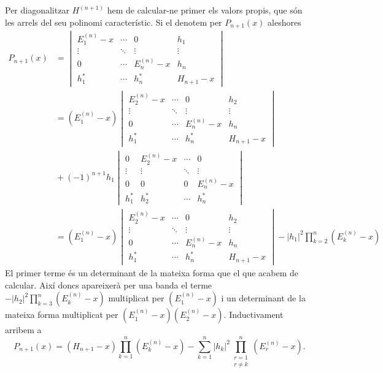 \documentclass[12pt]{article}
\numberwithin{table}{section}
\numberwithin{figure}{section}
\numberwithin{equation}{section}
\newcommand{\abs}[1]{\lvert #1 \rvert}
\begin{document}
Per diagonalitzar \( H^{(n+1)} \) hem de calcular-ne primer els valors propis, que són les arrels del seu polinomi característic. Si el denotem per \( P_{n+1}(x) \)	aleshores
\begin{align*}
	P_{n+1}(x) & = \begin{vmatrix}
		E_1^{(n)} - x & \cdots & 0 & h_1 \\
		\vdots & \ddots & \vdots & \vdots \\
		0 & \cdots & E_n^{(n)} - x & h_n \\
		h_1^{\ast} & \cdots & h_n^{\ast} & H_{n+1} - x
	\end{vmatrix} \\
	& = (E_1^{(n)} - x) 
	\begin{vmatrix}
		E_2^{(n)} - x & \cdots & 0 & h_2 \\
		\vdots & \ddots & \vdots & \vdots \\
		0 & \cdots & E_n^{(n)} - x & h_n \\
		h_1^{\ast} & \cdots & h_n^{\ast} & H_{n+1} - x
	\end{vmatrix} \\
	& {} + (-1)^{n+1}h_1
	\begin{vmatrix}
		0 & E_2^{(n)} - x & \cdots & 0 \\
		\vdots & \vdots & \ddots & \vdots \\
		0 & 0 & 0 & E_n^{(n)}	- x \\
		h_1^{\ast} & h_2^{\ast} & \cdots & h_n^{\ast}
	\end{vmatrix} \\
	& = (E_1^{(n)} - x) 
	\begin{vmatrix}
		E_2^{(n)} - x & \cdots & 0 & h_2 \\
		\vdots & \ddots & \vdots & \vdots \\
		0 & \cdots & E_n^{(n)} - x & h_n \\
		h_1^{\ast} & \cdots & h_n^{\ast} & H_{n+1} - x
	\end{vmatrix} - \abs{h_1}^2 \prod_{k = 2}^{n}(E_k^{(n)} - x) 
\end{align*}
El primer terme és un determinant de la mateixa forma que el que acabem de calcular. Així doncs apareixerà per una banda el terme \( -\abs{h_2}^2 \prod_{k = 3}^n (E_k^{(n)} - x) \) multiplicat per \( (E_1^{(n)} - x) \) i un determinant de la mateixa forma multiplicat per \( (E_1^{(n)} - x)(E_2^{(n)} - x) \). Inductivament arribem a 
\begin{equation*}
	P_{n+1}(x) = (H_{n+1} - x)\prod_{k = 1}^n(E_k^{(n)} - x) - \sum_{k = 1}^{n}\abs{h_k}^2 \prod_{\substack{r = 1 \\ r \neq k}}^n (E_r^{(n)} - x).
\end{equation*}
\end{document}
